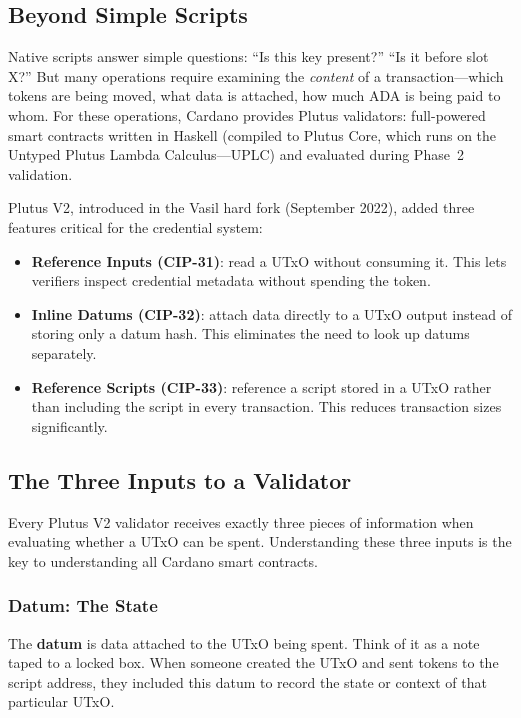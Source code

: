 \subsection{Beyond Simple Scripts}

Native scripts answer simple questions: ``Is this key present?'' ``Is
it before slot X?'' But many operations require examining the
\emph{content} of a transaction---which tokens are being moved, what
data is attached, how much ADA is being paid to whom. For these
operations, Cardano provides Plutus validators: full-powered smart
contracts written in Haskell (compiled to Plutus Core, which runs on
the Untyped Plutus Lambda Calculus---UPLC) and evaluated during
Phase~2 validation.

Plutus V2, introduced in the Vasil hard fork (September 2022), added
three features critical for the credential system:
\begin{itemize}[nosep]
  \item \textbf{Reference Inputs (CIP-31)}: read a UTxO without
    consuming it. This lets verifiers inspect credential metadata
    without spending the token.
  \item \textbf{Inline Datums (CIP-32)}: attach data directly to a
    UTxO output instead of storing only a datum hash. This eliminates
    the need to look up datums separately.
  \item \textbf{Reference Scripts (CIP-33)}: reference a script stored
    in a UTxO rather than including the script in every transaction.
    This reduces transaction sizes significantly.
\end{itemize}

\subsection{The Three Inputs to a Validator}

Every Plutus V2 validator receives exactly three pieces of information
when evaluating whether a UTxO can be spent. Understanding these three
inputs is the key to understanding all Cardano smart contracts.

\subsubsection{Datum: The State}

The \textbf{datum} is data attached to the UTxO being spent. Think of
it as a note taped to a locked box. When someone created the UTxO and
sent tokens to the script address, they included this datum to record
the state or context of that particular UTxO.

